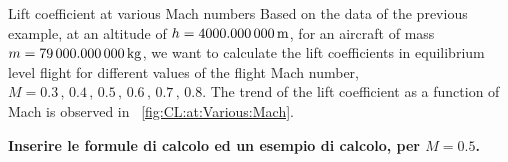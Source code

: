 \documentclass[[12pt,twoside]{book}
\begin{document}
%

%
\begin{myExampleX}{Lift coefficient at various Mach numbers}{}%
\label{example:Lift:Coefficient:At:Various:Mach}
%
\noindent
Based on the data of the previous example, at an altitude of $h=\SI[round-precision=0]{\myAltitudeM}{m}$, for an aircraft of mass $m=\SI[round-precision=0]{\myMassKg}{kg}$, we want to calculate the lift coefficients in equilibrium level flight for different values of the flight Mach number, $M = 0.3\,,\, 0.4\,,\, 0.5\,,\, 0.6\,,\, 0.7\,,\, 0.8$. The trend of the lift coefficient as a function of Mach is observed in \figurename~\vref{fig:CL:at:Various:Mach}.

\medskip
\noindent
{\color{red} \bf Inserire le formule di calcolo ed un esempio di calcolo, per $M=0.5$.}
\myTableDataset

\of{\myTableDataset}

\of{\myTableDataset}

\of{\myTableDataset}

\of{\myTableDataset}

\of{\myTableDataset}
%


\end{myExampleX}
\end{document}
